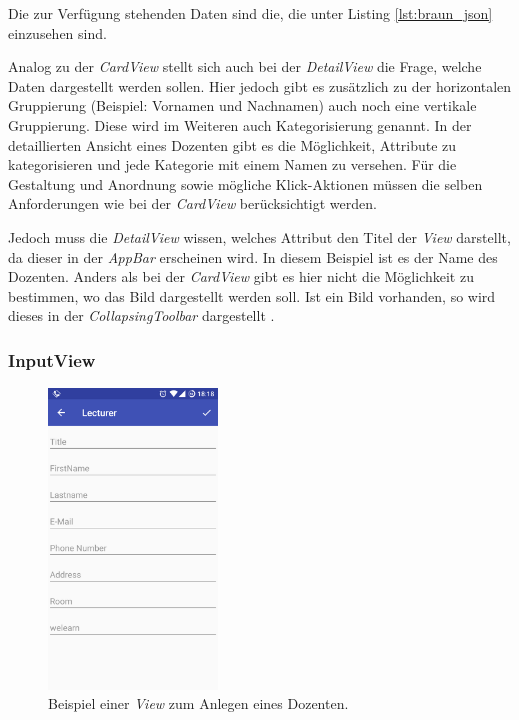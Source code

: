 Die zur Verfügung stehenden Daten sind die, die unter Listing \ref{lst:braun_json} einzusehen sind.

Analog zu der \textit{CardView} stellt sich auch bei der \textit{DetailView} die Frage, welche Daten dargestellt werden sollen. Hier jedoch gibt es zusätzlich zu der horizontalen Gruppierung (Beispiel: Vornamen und Nachnamen) auch noch eine vertikale Gruppierung. Diese wird im Weiteren auch Kategorisierung genannt. In der detaillierten Ansicht eines Dozenten gibt es die Möglichkeit, Attribute zu kategorisieren und jede Kategorie mit einem Namen zu versehen. Für die Gestaltung und Anordnung sowie mögliche Klick-Aktionen müssen die selben Anforderungen wie bei der \textit{CardView} berücksichtigt werden. 

Jedoch muss die \textit{DetailView} wissen, welches Attribut den Titel der \textit{View} darstellt, da dieser in der \textit{AppBar} erscheinen wird. In diesem Beispiel ist es der Name des Dozenten. Anders als bei der \textit{CardView} gibt es hier nicht die Möglichkeit zu bestimmen, wo das Bild dargestellt werden soll. Ist ein Bild vorhanden, so wird dieses in der \textit{CollapsingToolbar} dargestellt \cite{collapsing}.

\subsubsection{InputView}

\begin{figure}[H]
	\begin{center}
		\includegraphics[width=0.4\textwidth]{images/input.png}
		\caption{Beispiel einer \textit{View} zum Anlegen eines Dozenten.}
		\label{fig:input}
	\end{center}
\end{figure}

